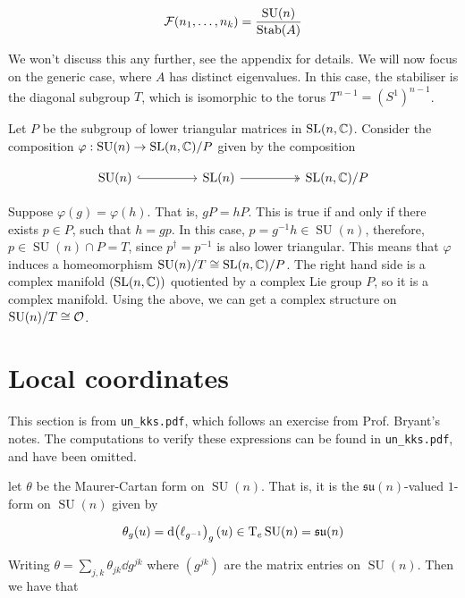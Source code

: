 \documentclass{article}
\DeclareMathOperator{\SU}{SU}
\newcommand{\su}{\mathfrak{su}}
\begin{document}
\[\mcF(n_1, \dots, n_k) = \frac{\SU(n)}{\Stab(A)}\]

We won't discuss this any further, see the appendix for details. We will now focus on the generic case, where \(A\) has distinct eigenvalues. In this case, the stabiliser is the diagonal subgroup \(T\), which is isomorphic to the torus \(T^{n-1} = (S^1)^{n-1}\).

Let \(P\) be the subgroup of lower triangular matrices in \(\operatorname{SL}(n, \mathbb{C})\). Consider the composition \(\varphi : \SU(n) \to \SL(n, \C)/P\) given by the composition 

\[\begin{tikzcd}
	{\SU(n)} && {\SL(n)} && {\SL(n, \C)/P}
	\arrow[hook, from=1-1, to=1-3]
	\arrow[two heads, from=1-3, to=1-5]
\end{tikzcd}\]

Suppose \(\varphi(g) = \varphi(h)\). That is, \(gP = hP\). This is true if and only if there exists \(p \in P\), such that \(h = gp\). In this case, \(p = g^{-1}h \in \SU(n)\), therefore, \(p \in \SU(n) \cap P = T\), since \(p^\dagger = p^{-1}\) is also lower triangular. This means that \(\varphi\) induces a homeomorphism \(\SU(n)/T \cong \SL(n, \C)/P\). The right hand side is a complex manifold \((\operatorname{SL}(n, \mathbb{C}))\) quotiented by a complex Lie group \(P\), so it is a complex manifold. Using the above, we can get a complex structure on \(\SU(n)/T \cong \mcO\).

\section{Local coordinates}

This section is from \texttt{un\_kks.pdf}, which follows an exercise from Prof. Bryant's notes. The computations to verify these expressions can be found in \texttt{un\_kks.pdf}, and have been omitted.

let \(\theta\) be the Maurer-Cartan form on \(\SU(n)\). That is, it is the \(\su(n)\)-valued \(1\)-form on \(\SU(n)\) given by

\[\theta_g(u) = \dd (\ell_{g^{-1}})_g(u) \in \TT_e\SU(n) = \su(n)\]

Writing \(\theta = \sum_{j, k}\theta_{jk}\dd g^{jk}\) where \((g^{jk})\) are the matrix entries on \(\SU(n)\). Then we have that
\end{document}
